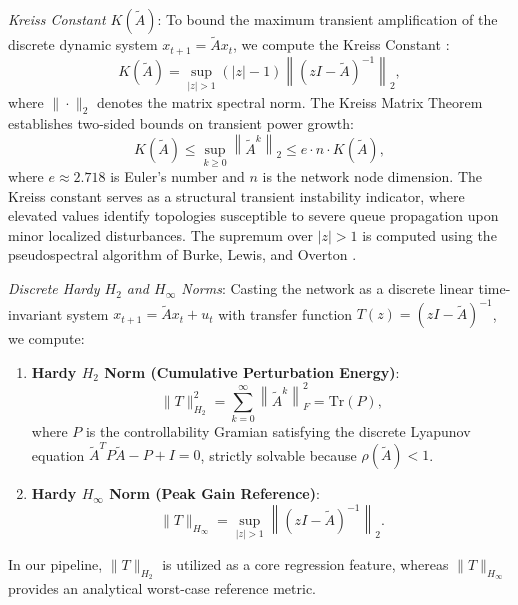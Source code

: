 \documentclass[journal]{IEEEtran}
\begin{document}
\textit{Kreiss Constant $K(\tilde{A})$}: To bound the maximum transient amplification of the discrete dynamic system $x_{t+1} = \tilde{A} x_t$, we compute the Kreiss Constant \cite{Kreiss1962}:
\begin{equation}
K(\tilde{A}) = \sup_{|z| > 1} (|z| - 1) \left\| (zI - \tilde{A})^{-1} \right\|_2,
\label{eq:kreiss}
\end{equation}
where $\|\cdot\|_2$ denotes the matrix spectral norm. The Kreiss Matrix Theorem establishes two-sided bounds on transient power growth:
\begin{equation}
K(\tilde{A}) \le \sup_{k \ge 0} \left\| \tilde{A}^k \right\|_2 \le e \cdot n \cdot K(\tilde{A}),
\label{eq:kreiss_bounds}
\end{equation}
where $e \approx 2.718$ is Euler's number and $n$ is the network node dimension. The Kreiss constant serves as a structural transient instability indicator, where elevated values identify topologies susceptible to severe queue propagation upon minor localized disturbances. The supremum over $|z| > 1$ is computed using the pseudospectral algorithm of Burke, Lewis, and Overton \cite{Burke2003}.

\textit{Discrete Hardy $H_2$ and $H_\infty$ Norms}: Casting the network as a discrete linear time-invariant system $x_{t+1} = \tilde{A} x_t + u_t$ with transfer function $T(z) = (zI - \tilde{A})^{-1}$, we compute:
\begin{enumerate}
    \item \textbf{Hardy $H_2$ Norm (Cumulative Perturbation Energy)}:
    \begin{equation}
    \|T\|_{H_2}^2 = \sum_{k=0}^{\infty} \left\| \tilde{A}^k \right\|_F^2 = \text{Tr}(P),
    \label{eq:hardy_h2}
    \end{equation}
    where $P$ is the controllability Gramian satisfying the discrete Lyapunov equation $\tilde{A}^T P \tilde{A} - P + I = 0$, strictly solvable because $\rho(\tilde{A}) < 1$.
    \item \textbf{Hardy $H_\infty$ Norm (Peak Gain Reference)}:
    \begin{equation}
    \|T\|_{H_\infty} = \sup_{|z| > 1} \left\| (zI - \tilde{A})^{-1} \right\|_2.
    \label{eq:hardy_hinf}
    \end{equation}
\end{enumerate}
In our pipeline, $\|T\|_{H_2}$ is utilized as a core regression feature, whereas $\|T\|_{H_\infty}$ provides an analytical worst-case reference metric.
\end{document}
